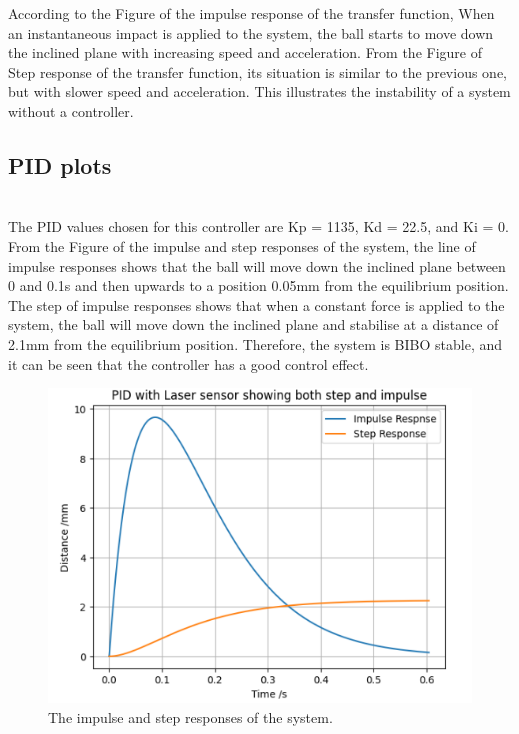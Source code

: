 \noindent According to the Figure of the impulse response of the transfer function, When an instantaneous impact is applied to the system, the ball starts to move down the inclined plane  with increasing speed and acceleration. From the Figure of Step response of the transfer function, its situation is similar to the previous one, but with slower speed and acceleration. This illustrates the instability of a system without a controller.
\subsection*{PID plots}\hfill \\
\noindent The PID values chosen for this controller are Kp = 1135, Kd = 22.5, and Ki = 0. From the Figure of the impulse and step responses of the system, the line of impulse responses shows that the ball will move down the inclined plane between 0 and 0.1s and then upwards to a position 0.05mm from the equilibrium position. The step of impulse responses shows that when a constant force is applied to the system, the ball will move down the inclined plane and stabilise at a distance of 2.1mm from the equilibrium position. Therefore, the system is BIBO
stable, and it can be seen that the controller has a good control effect.
\begin{figure}[ht]
    \includegraphics[width=0.65\linewidth]{Simulation/PID + Laser Both Step and Impulse plot.png}
    \caption{The impulse and step responses of the system.}
\end{figure}







